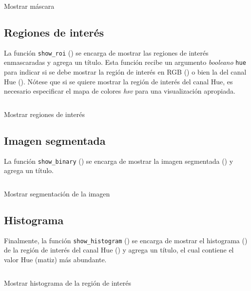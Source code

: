 \begin{listing}[H]
\inputminted{python}{code_listings/show_mask.py}
\caption{Mostrar máscara}
\label{code:show_mask}
\end{listing}

\subsection{Regiones de interés}
La función \texttt{show\_roi} () se encarga de mostrar las regiones de interés enmascaradas y agrega un título. Esta función recibe un argumento \textit{booleano} \texttt{hue} para indicar si se debe mostrar la región de interés en \textsf{RGB} () o bien la del canal Hue (). Nótese que si se quiere mostrar la región de interés del canal Hue, es necesario especificar el mapa de colores \textit{hsv} para una visualización apropiada.

\begin{listing}[H]
\inputminted{python}{code_listings/show_roi.py}
\caption{Mostrar regiones de interés}
\label{code:show_roi}
\end{listing}

\subsection{Imagen segmentada}
La función \texttt{show\_binary} () se encarga de mostrar la imagen segmentada () y agrega un título.

\begin{listing}[H]
\inputminted{python}{code_listings/show_segmentation.py}
\caption{Mostrar segmentación de la imagen}
\label{code:show_segmentation}
\end{listing}

\subsection{Histograma}
Finalmente, la función \texttt{show\_histogram} () se encarga de mostrar el histograma () de la región de interés del canal Hue () y agrega un título, el cual contiene el valor Hue (matiz) más abundante.

\begin{listing}[H]
\inputminted{python}{code_listings/show_histogram.py}
\caption{Mostrar histograma de la región de interés}
\label{code:show_histogram}
\end{listing}